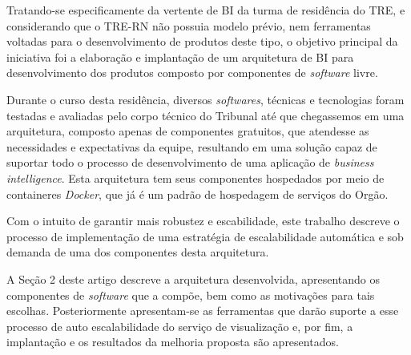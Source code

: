 Tratando-se especificamente da vertente de BI da turma de residência do TRE, e considerando que o TRE-RN não possuia modelo prévio, nem ferramentas voltadas para o desenvolvimento de produtos deste tipo, o objetivo principal da iniciativa foi a elaboração e implantação de um arquitetura de BI para desenvolvimento dos produtos composto por componentes de \textit{software} livre. 

Durante o curso desta residência, diversos \textit{softwares}, técnicas e tecnologias foram testadas e avaliadas pelo corpo técnico do Tribunal até que chegassemos em uma arquitetura, composto apenas de componentes gratuitos, que atendesse as necessidades e expectativas da equipe, resultando em uma solução capaz de suportar todo o processo de desenvolvimento de uma aplicação de \textit{business intelligence}. Esta arquitetura tem seus componentes hospedados por meio de containeres \textit{Docker}, que já é um padrão de hospedagem de serviços do Orgão.

Com o intuito de garantir mais robustez e escabilidade, este trabalho descreve o processo de implementação de uma estratégia de escalabilidade automática e sob demanda de uma dos componentes desta arquitetura.  

A Seção 2 deste artigo descreve a arquitetura desenvolvida, apresentando os componentes de \textit{software} que a compõe, bem como as motivações para tais escolhas. Posteriormente apresentam-se as ferramentas que darão suporte a esse processo de auto escalabilidade do serviço de visualização e, por fim, a implantação e os resultados da melhoria proposta são apresentados.